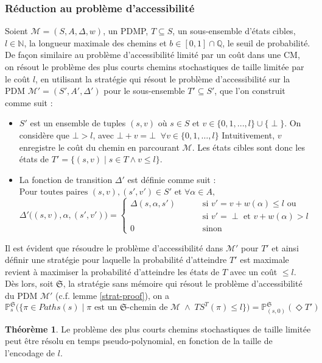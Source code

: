 \documentclass[12pt,a4paper]{report}
\theoremstyle{definition}%
\newtheorem{theorem}{Théorème}[chapter]
\theoremstyle{remark}
\newcommand{\pr}{\mathbb{P}}
\let\labelitemi\labelitemii
\begin{document}
\subsubsection*{Réduction au problème d'accessibilité}
Soient $\mathcal{M} = (S, A, \Delta, w)$, un PDMP, $T \subseteq S$, un
sous-ensemble d'états cibles, $l \in \mathbb{N}$, la longueur maximale des
chemins et $b \in [0, 1] \cap \mathbb{Q}$, le seuil de probabilité.
De façon similaire au problème d'accessibilité limité par un coût dans une CM,
on résout le problème
des plus courts chemins stochastiques de taille limitée par le coût $l$,
en utilisant la stratégie qui résout le problème d'accessibilité sur la PDM
$\mathcal{M'} = (S', A', \Delta')$ pour le sous-ensemble $T' \subseteq S'$,
que l'on construit comme suit :
\begin{itemize}
\renewcommand{\labelitemi}{\tiny$\bullet$}
\item $S'$ est un ensemble de tuples $(s, v)$ où $s \in S$ et $v \in \{0, 1, ..., l\} \cup \{\perp\}$.
On considère que $\bot > l$, avec $\bot + v = \bot \; \; \forall v \in \{0, 1, \dots, l\}$
Intuitivement, $v$ enregistre le coût du chemin en parcourant $\mathcal{M}$.
Les états cibles sont donc les états de
$T' = \{(s, v) \;|\; s \in T \wedge v \leq l \}$.
\item La fonction de transition $\Delta'$ est définie comme suit :\\
$\text{Pour toutes paires } (s, v), (s', v') \in S' \text{ et } \forall \alpha \in A,$
\[
\Delta'\big((s, v), \alpha, (s', v')\big) =
\begin{cases}
	\Delta(s, \alpha, s') & \quad \quad \text{ si } v' = v + w(\alpha) \leq l \text{ ou}\\
	 & \quad \quad \text{ si } v' = \perp \text{ et } v+w(\alpha) > l \\
	0 & \quad \quad \text{ sinon}
\end{cases}
\]
\end{itemize}
Il est évident que résoudre le problème d'accessibilité dans $\mathcal{M}'$
pour $T'$ et ainsi définir une stratégie pour laquelle la probabilité d'atteindre $T'$ est maximale revient à maximiser la probabilité d'atteindre les états de $T$ avec un coût $\leq l$. Dès lors, soit $\mathfrak{S}$, la stratégie sans mémoire qui résout le problème
d'accessibilité du PDM $\mathcal{M}'$ (c.f. lemme \ref{strat-proof}),
on a
\[
	\pr^\mathfrak{S}_s\big( \{ \pi \in Paths(s) \; | \; \pi \text{ est un } \mathfrak{S}\text{-chemin de } \mathcal{M} \; \wedge \;  TS^T(\pi) \leq l\}\big)
	=
	\pr^\mathfrak{S}_{(s, 0)}(\Diamond T')
\]

\begin{theorem}
	Le problème des plus courts chemins stochastiques de taille limitée peut être
	résolu en temps pseudo-polynomial, en fonction de la taille de l'encodage de
	$l$.
\end{theorem}



\end{document}
